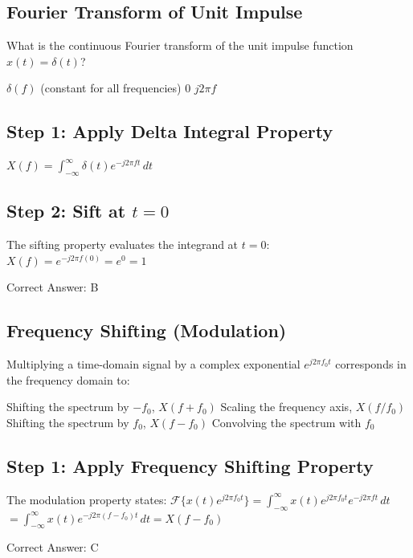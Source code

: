 \clearpage

\subsection{Fourier Transform of Unit Impulse}

What is the continuous Fourier transform of the unit impulse function $x(t) = \delta(t)$?

\begin{choices}
    \choice $\delta(f)$
     (constant for all frequencies)
    \choice $0$
    \choice $j 2\pi f$
\end{choices}

\begin{solution}

\subsection*{Step 1: Apply Delta Integral Property}
$X(f) = \int_{-\infty}^{\infty} \delta(t) e^{-j 2\pi f t}\, dt$

\subsection*{Step 2: Sift at $t = 0$}
The sifting property evaluates the integrand at $t = 0$:
$X(f) = e^{-j 2\pi f (0)} = e^0 = 1$

Correct Answer: B
\end{solution}

\clearpage

\subsection{Frequency Shifting (Modulation)}

Multiplying a time-domain signal by a complex exponential $e^{j 2\pi f_0 t}$ corresponds in the frequency domain to:

\begin{choices}
    \choice Shifting the spectrum by $-f_0$, $X(f + f_0)$
    \choice Scaling the frequency axis, $X(f / f_0)$
    \correctchoice Shifting the spectrum by $f_0$, $X(f - f_0)$
    \choice Convolving the spectrum with $f_0$
\end{choices}

\begin{solution}

\subsection*{Step 1: Apply Frequency Shifting Property}
The modulation property states:
$\mathcal{F}\{x(t) e^{j 2\pi f_0 t}\} = \int_{-\infty}^{\infty} x(t) e^{j 2\pi f_0 t} e^{-j 2\pi f t}\, dt$
$= \int_{-\infty}^{\infty} x(t) e^{-j 2\pi (f - f_0) t}\, dt = X(f - f_0)$

Correct Answer: C
\end{solution}

